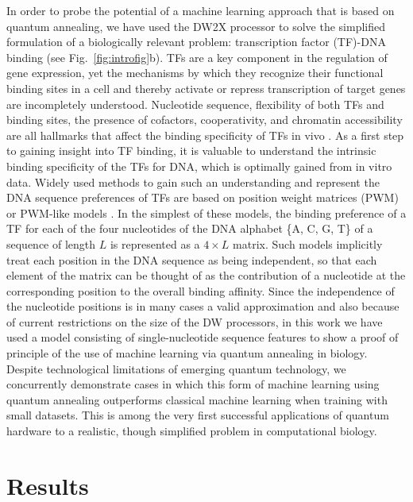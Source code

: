 \documentclass[aps,pra,groupedaddress,nofootinbib,notitlepage,showpacs,floatfix,superscriptaddress]{revtex4-1}
\begin{document}
In order to probe the potential of a machine learning approach that is based on quantum annealing, we have used the DW2X processor to solve the simplified formulation of a biologically relevant problem: transcription factor (TF)-DNA binding (see Fig.~\ref{fig:introfig}b). TFs are a key component in the regulation of gene expression, yet the mechanisms by which they recognize their functional binding sites in a cell and thereby activate or repress transcription of target genes are incompletely understood. Nucleotide sequence, flexibility of both TFs and binding sites, the presence of cofactors, cooperativity, and chromatin accessibility are all hallmarks that affect the binding specificity of TFs in vivo \cite{Slattery:14,Shlyueva:14}. 
As a first step to gaining insight into TF binding, it is valuable to understand the intrinsic binding specificity of the TFs for DNA, which is optimally gained from in vitro data. Widely used methods to gain such an understanding and represent the DNA sequence preferences of TFs are based on position weight matrices (PWM) or PWM-like models \cite{Stormo:10}. In the simplest of these models, the binding preference of a TF for each of the four nucleotides of the DNA alphabet \{A, C, G, T\} of a sequence of length $L$ is represented as a $4\times L$ matrix. Such models implicitly treat each position in the DNA sequence as being independent, so that each element of the matrix can be thought of as the contribution of a nucleotide at the corresponding position to the overall binding affinity. Since the independence of the nucleotide positions is in many cases a valid approximation and also because of current restrictions on the size of the DW processors, in this work we have used a model consisting of single-nucleotide sequence features to show a proof of principle of the use of machine learning via quantum annealing in biology. Despite technological limitations of emerging quantum technology, we concurrently demonstrate cases in which this form of machine learning using quantum annealing outperforms classical machine learning when training with small datasets. This is among the very first successful applications of quantum hardware to a realistic, though simplified problem in computational biology. 

\section*{Results}
\end{document}
